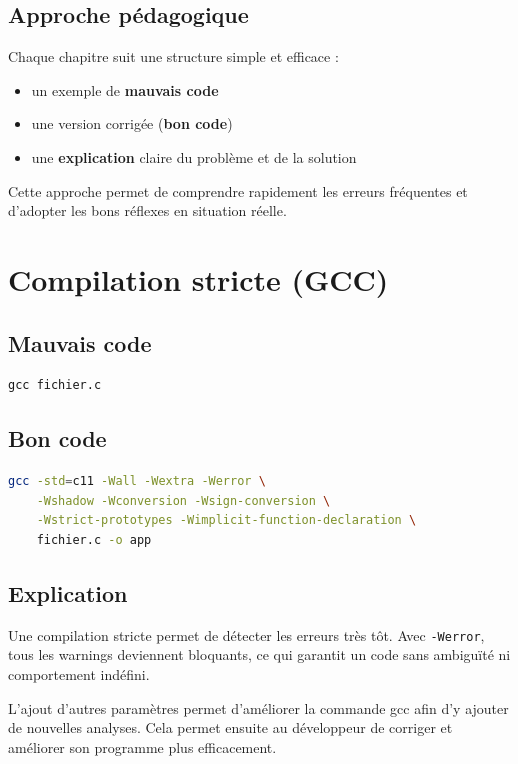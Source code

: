 \documentclass[a4paper,11pt]{report}
\begin{document}
\section{Approche pédagogique}

Chaque chapitre suit une structure simple et efficace :
\begin{itemize}
  \item un exemple de \textbf{mauvais code}
  \item une version corrigée (\textbf{bon code})
  \item une \textbf{explication} claire du problème et de la solution
\end{itemize}

Cette approche permet de comprendre rapidement les erreurs fréquentes et
d'adopter les bons réflexes en situation réelle.

\chapter{Compilation stricte (GCC)}

\section{Mauvais code}
\begin{lstlisting}
gcc fichier.c
\end{lstlisting}

\section{Bon code}
\begin{lstlisting}[language=bash]
gcc -std=c11 -Wall -Wextra -Werror \
    -Wshadow -Wconversion -Wsign-conversion \
    -Wstrict-prototypes -Wimplicit-function-declaration \
    fichier.c -o app
\end{lstlisting}

\section{Explication}
Une compilation stricte permet de détecter les erreurs très tôt. Avec \texttt{-Werror}, tous les warnings deviennent bloquants, ce qui garantit un code sans ambiguïté ni comportement indéfini.

L'ajout d'autres paramètres permet d'améliorer la commande gcc afin  d'y ajouter de nouvelles analyses. Cela permet ensuite au développeur de corriger et améliorer son programme plus efficacement.
\end{document}
